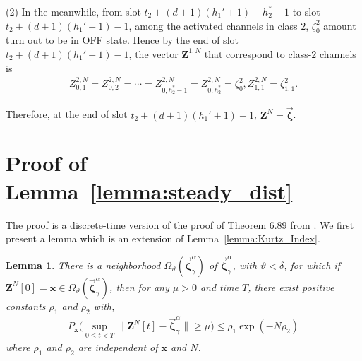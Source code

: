 \documentclass[11pt,twocolumn]{IEEEtran}
\newtheorem{lemma}{Lemma}
\begin{document}
\noindent(2) In the meanwhile, from slot $t_2+(d+1)(h_1'+1)-h_2^*-1$ to slot $t_2+(d+1)(h_1'+1)-1$, among the activated channels in class $2$, $\zeta^2_0$ amount turn out to be in OFF state. Hence by the end of slot $t_2+(d+1)(h_1'+1)-1$, the vector $\bm Z^{1,N}$ that correspond to class-$2$ channels is
\begin{align}
Z^{2,N}_{0,1}{=}Z^{2,N}_{0,2}{=}\cdots{=}Z^{2,N}_{0,h_2^*-1}{=} Z^{2,N}_{0,h_2^*}{=}\zeta^2_0, Z^{2,N}_{1,1}{=} \zeta^2_{1,1}. \nonumber
\end{align}


Therefore, at the end of slot $t_2+(d+1)(h_1'+1)-1$,  $\bm Z^N=\vec{\bm \zeta}$.
\vspace{10pt}


\section{Proof of Lemma~\ref{lemma:steady_dist}}
\label{appen:Invar_meas}

The proof is a discrete-time version of the proof of Theorem 6.89 from \cite{Weiss_LD}. We first present a lemma which is an extension of Lemma~\ref{lemma:Kurtz_Index}.
\begin{lemma}
\label{lemma:Kurtz_Index3}
There is a neighborhood $\Omega_{\vartheta}(\vec{\bm \zeta}^{\alpha}_{\gamma})$ of $\vec{\bm \zeta}^{\alpha}_{\gamma}$, with $\vartheta<\delta$, for which if $\bm Z^N[0]=\bm x \in \Omega_{\vartheta}(\vec{\bm \zeta}^{\alpha}_{\gamma})$, then for any $\mu>0$ and time $T$, there exist positive constants $\rho_1$ and $\rho_2$ with,
\begin{align}
P_{\bm x}\Big( \sup_{0 \leq t < T} \|\bm Z^{N}[t]-\vec{\bm \zeta}^{\alpha}_{\gamma} \| \geq \mu \Big)\leq \rho_1 \exp(-N \rho_2) \nonumber
\end{align}
where $\rho_1$ and $\rho_2$ are independent of $\bm x$ and $N$.
\end{lemma}
\end{document}
